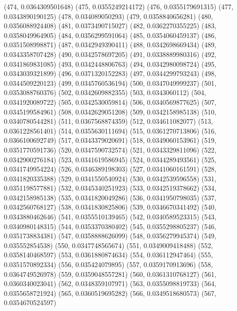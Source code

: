 {					(474, 0.0364309501648)
					(475, 0.0355249214172)
					(476, 0.0355179691315)
					(477, 0.0343890190125)
					(478, 0.034089050293)
					(479, 0.0358840656281)
					(480, 0.0356088924408)
					(481, 0.0373490715027)
					(482, 0.0362270355225)
					(483, 0.0358049964905)
					(484, 0.0356299591064)
					(485, 0.0354060459137)
					(486, 0.0351508998871)
					(487, 0.0342949390411)
					(488, 0.0342698669434)
					(489, 0.0343358707428)
					(490, 0.0342578697205)
					(491, 0.0338889980316)
					(492, 0.0341869831085)
					(493, 0.0342448806763)
					(494, 0.0342980098724)
					(495, 0.0343039321899)
					(496, 0.0371320152283)
					(497, 0.0344299793243)
					(498, 0.0344509220123)
					(499, 0.0345760536194)
					(500, 0.0347049999237)
					(501, 0.0353088760376)
					(502, 0.0342609882355)
					(503, 0.0343060112)
					(504, 0.0341920089722)
					(505, 0.0342530059814)
					(506, 0.0340569877625)
					(507, 0.0345199584961)
					(508, 0.0342629051208)
					(509, 0.0342158985138)
					(510, 0.0340780544281)
					(511, 0.0367568874359)
					(512, 0.034611082077)
					(513, 0.0361228561401)
					(514, 0.0355630111694)
					(515, 0.0361270713806)
					(516, 0.0366100692749)
					(517, 0.0343379020691)
					(518, 0.0349060153961)
					(519, 0.0351770591736)
					(520, 0.0347590732574)
					(521, 0.0343329811096)
					(522, 0.0342900276184)
					(523, 0.0341619586945)
					(524, 0.0344289493561)
					(525, 0.0341749954224)
					(526, 0.0346389198303)
					(527, 0.0341060161591)
					(528, 0.0341820335388)
					(529, 0.0341550540924)
					(530, 0.0342539596558)
					(531, 0.0351198577881)
					(532, 0.0345340251923)
					(533, 0.0342519378662)
					(534, 0.0342158985138)
					(535, 0.0341820049286)
					(536, 0.0341950798035)
					(537, 0.0342560768127)
					(538, 0.0341830825806)
					(539, 0.0346670341492)
					(540, 0.0343880462646)
					(541, 0.0355510139465)
					(542, 0.0340589523315)
					(543, 0.0340980148315)
					(544, 0.0353370380402)
					(545, 0.0355298805237)
					(546, 0.0351738834381)
					(547, 0.0358888626099)
					(548, 0.0356279945374)
					(549, 0.035552854538)
					(550, 0.0347748565674)
					(551, 0.0349009418488)
					(552, 0.0358140468597)
					(553, 0.0361880874634)
					(554, 0.036112947464)
					(555, 0.0351570892334)
					(556, 0.035424079895)
					(557, 0.0359170913696)
					(558, 0.0364749526978)
					(559, 0.0359048557281)
					(560, 0.0361310768127)
					(561, 0.0360340023041)
					(562, 0.0348359107971)
					(563, 0.0355098819733)
					(564, 0.0355658721924)
					(565, 0.0360519695282)
					(566, 0.0349518680573)
					(567, 0.0354670524597)
}
